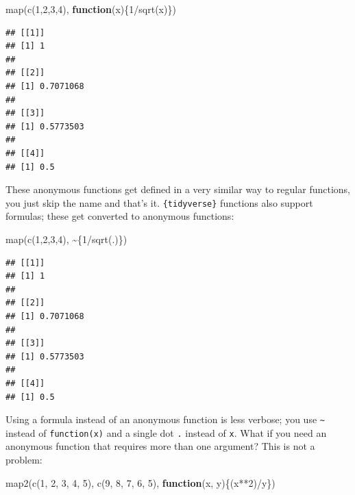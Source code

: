 \documentclass[
]{article}
\newenvironment{Shaded}{\begin{snugshade}}{\end{snugshade}}
\newcommand{\ControlFlowTok}[1]{\textcolor[rgb]{0.13,0.29,0.53}{\textbf{#1}}}
\newcommand{\DecValTok}[1]{\textcolor[rgb]{0.00,0.00,0.81}{#1}}
\newcommand{\FunctionTok}[1]{\textcolor[rgb]{0.00,0.00,0.00}{#1}}
\newcommand{\NormalTok}[1]{#1}
\newcommand{\SpecialCharTok}[1]{\textcolor[rgb]{0.00,0.00,0.00}{#1}}
\begin{document}
\begin{Shaded}
\begin{Highlighting}[]
\FunctionTok{map}\NormalTok{(}\FunctionTok{c}\NormalTok{(}\DecValTok{1}\NormalTok{,}\DecValTok{2}\NormalTok{,}\DecValTok{3}\NormalTok{,}\DecValTok{4}\NormalTok{), }\ControlFlowTok{function}\NormalTok{(x)\{}\DecValTok{1}\SpecialCharTok{/}\FunctionTok{sqrt}\NormalTok{(x)\})}
\end{Highlighting}
\end{Shaded}

\begin{verbatim}
## [[1]]
## [1] 1
## 
## [[2]]
## [1] 0.7071068
## 
## [[3]]
## [1] 0.5773503
## 
## [[4]]
## [1] 0.5
\end{verbatim}

These anonymous functions get defined in a very similar way to regular functions, you just skip the
name and that's it. \texttt{\{tidyverse\}} functions also support formulas; these get converted to anonymous functions:

\begin{Shaded}
\begin{Highlighting}[]
\FunctionTok{map}\NormalTok{(}\FunctionTok{c}\NormalTok{(}\DecValTok{1}\NormalTok{,}\DecValTok{2}\NormalTok{,}\DecValTok{3}\NormalTok{,}\DecValTok{4}\NormalTok{), }\SpecialCharTok{\textasciitilde{}}\NormalTok{\{}\DecValTok{1}\SpecialCharTok{/}\FunctionTok{sqrt}\NormalTok{(.)\})}
\end{Highlighting}
\end{Shaded}

\begin{verbatim}
## [[1]]
## [1] 1
## 
## [[2]]
## [1] 0.7071068
## 
## [[3]]
## [1] 0.5773503
## 
## [[4]]
## [1] 0.5
\end{verbatim}

Using a formula instead of an anonymous function is less verbose; you use \texttt{\textasciitilde{}} instead of \texttt{function(x)}
and a single dot \texttt{.} instead of \texttt{x}. What if you need an anonymous function that requires more than
one argument? This is not a problem:

\begin{Shaded}
\begin{Highlighting}[]
\FunctionTok{map2}\NormalTok{(}\FunctionTok{c}\NormalTok{(}\DecValTok{1}\NormalTok{, }\DecValTok{2}\NormalTok{, }\DecValTok{3}\NormalTok{, }\DecValTok{4}\NormalTok{, }\DecValTok{5}\NormalTok{), }\FunctionTok{c}\NormalTok{(}\DecValTok{9}\NormalTok{, }\DecValTok{8}\NormalTok{, }\DecValTok{7}\NormalTok{, }\DecValTok{6}\NormalTok{, }\DecValTok{5}\NormalTok{), }\ControlFlowTok{function}\NormalTok{(x, y)\{(x}\SpecialCharTok{**}\DecValTok{2}\NormalTok{)}\SpecialCharTok{/}\NormalTok{y\})}
\end{Highlighting}
\end{Shaded}
\end{document}
